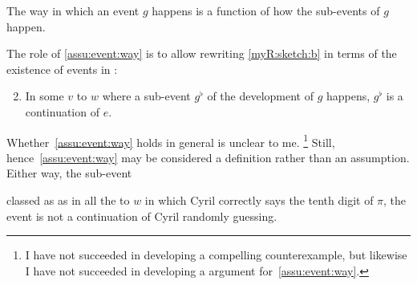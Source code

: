\begin{note}[Way]
  \begin{assumption}
    \label{assu:event:way}
    The way in which an event \(g\) happens is a function of how the sub-events of \(g\) happen.
  \end{assumption}

  The role of \autoref{assu:event:way} is to allow rewriting \ref{myR:sketch:b} in terms of the existence of events in :

  \begin{enumerate}[label=\alph*\('\)., ref=(\alph*\('\))]
    \setcounter{enumi}{1}
  \item
    In some  \(v\) to \(w\) where a sub-event \(g^{\flat}\) of the development of \(g\) happens, \(g^{\flat}\) is a continuation of \(e\).
  \end{enumerate}

  Whether~\autoref{assu:event:way} holds in general is unclear to me.%
  \footnote{
    I have not succeeded in developing a compelling counterexample, but likewise I have not succeeded in developing a argument for~\autoref{assu:event:way}.
  }
  Still, hence~\autoref{assu:event:way} may be considered a definition rather than an assumption.
  Either way, the sub-event

  classed as  as in all the  to \(w\) in which Cyril correctly says the tenth digit of \(\pi\), the event is not a continuation of Cyril randomly guessing.
\end{note}

